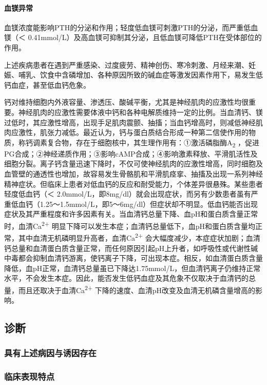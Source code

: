 \paragraph{血镁异常}

血镁浓度能影响PTH的分泌和作用；轻度低血镁可刺激PTH的分泌，而严重低血镁（＜
0.41mmol/L）及高血镁可抑制其分泌，且低血镁可降低PTH在受体部位的作用。

上述疾病患者在遇到严重感染、过度疲劳、精神创伤、寒冷刺激、月经来潮、妊娠、哺乳、饮食中含磷增加、各种原因所致的碱血症等激发因素作用下，易发生低钙血症，甚至低血钙危象。

钙对维持细胞内外液容量、渗透压、酸碱平衡，尤其是神经肌肉的应激性均很重要。神经肌肉的应激性需要体液中钙和各种电解质维持一定的比例。当血清钙、镁过低时，其应激性增高，出现手足肌肉震颤、抽搐；当血钙增高时，则减低神经肌肉应激性，肌张力减低。最近认为，钙与蛋白质结合形成一种第二信使作用的物质，称钙调素复合物，存在于细胞核中，其生理作用有：①激活磷脂酶A\textsubscript{2}
，促进PG合成；②神经递质作用；③影响cAMP合成；④影响激素释放、平滑肌活性及细胞分裂。离子钙含量迅速下降时，不仅可使神经肌肉的应激性增高，同时细胞及血管壁的通透性也增加，故容易发生骨骼肌和平滑肌痉挛、抽搐及出现一系列神经精神症状。但临床上患者对低血钙的反应和耐受能力，个体差异很悬殊。某些患者轻度低血钙（＜
2.0mmol/L，即8mg/dl）就会出现症状，而另有少数患者虽有严重低血钙（1.25～1.5mmol/L，即5～6mg/dl）但症状却不明显。低血钙能否出现症状及其严重程度和许多因素有关。当血清钙总量下降、血pH和蛋白质含量正常时，血清Ca\textsuperscript{2+}
明显下降可以发生本症；血清钙总量低下，血pH和蛋白质含量均正常，其中血清无机磷明显升高者，血清Ca\textsuperscript{2+}
会大幅度减少，本症症状加剧；血清钙总量和血清蛋白质含量正常，而任何原因引起pH上升者，如呼吸性或代谢性碱中毒都会抑制血清钙游离，使钙离子下降，可出现本症。相反，如血清蛋白质含量降低，血pH正常，血清钙总量虽已下降达1.75mmol/L，但血清钙离子仍维持正常水平，不会发生本症。因此，能否发生低钙血症及其危象不仅取决于血清钙的总量，而且还取决于血清Ca\textsuperscript{2+}
下降的速度、血清pH改变及血清无机磷含量增高的影响。

\subsection{诊断}

\subsubsection{具有上述病因与诱因存在}

\subsubsection{临床表现特点}

